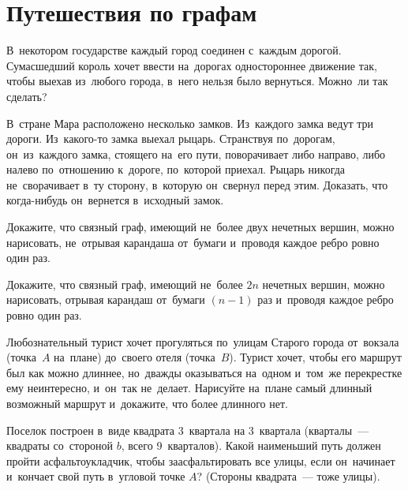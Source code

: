 
\section*{Путешествия по графам}


\begin{problems}

\item
В~некотором государстве каждый город соединен с~каждым дорогой.
Сумасшедший король хочет ввести на~дорогах одностороннее движение так, чтобы
выехав из~любого города, в~него нельзя было вернуться.
Можно~ли так сделать?

\item
В~стране Мара расположено несколько замков.
Из~каждого замка ведут три дороги.
Из~какого-то замка выехал рыцарь.
Странствуя по~дорогам, он~из~каждого замка, стоящего на~его пути, поворачивает
либо направо, либо налево по~отношению к~дороге, по~которой приехал.
Рыцарь никогда не~сворачивает в~ту сторону, в~которую он~свернул перед этим.
Доказать, что когда-нибудь он~вернется в~исходный замок.

\item
Докажите, что связный граф, имеющий не~более двух нечетных вершин, можно
нарисовать, не~отрывая карандаша от~бумаги и~проводя каждое ребро ровно один
раз.

\item
Докажите, что связный граф, имеющий не~более $2 n$ нечетных вершин, можно
нарисовать, отрывая карандаш от~бумаги $(n - 1)$ раз и~проводя каждое ребро
ровно один раз.

\item
Любознательный турист хочет прогуляться по~улицам Старого города от~вокзала
(точка~$A$ на~плане) до~своего отеля (точка~$B$).
Турист хочет, чтобы его маршрут был как можно длиннее, но~дважды оказываться
на~одном и~том~же перекрестке ему неинтересно, и~он~так не~делает.
Нарисуйте на~плане самый длинный возможный маршрут и~докажите, что более
длинного нет.

\begin{center}
\end{center}

\item
Поселок построен в~виде квадрата 3~квартала на 3~квартала (кварталы~---
квадраты со~стороной $b$, всего 9~кварталов).
Какой наименьший путь должен пройти асфальтоукладчик, чтобы заасфальтировать
все улицы, если он~начинает и~кончает свой путь в~угловой точке $A$?
(Стороны квадрата~--- тоже улицы).


\end{problems}
